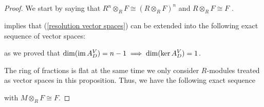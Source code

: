 \begin{proof} 
  We start by saying that $R^n\otimes_R F\cong (R\otimes_R F)^n$ and $R\otimes_R F\cong F$ \cite[Proposition~2.14]{atiyah}.

    implies that (\ref{resolution vector spaces}) can be extended into the following exact sequence of vector spaces:
   \begin{center}
   \end{center}
   as we proved that $\dim(\operatorname{im} A_D^V)=n-1\implies \dim(\ker A_D^V)=1$.

  The ring of fractions is flat \cite[Chapter~3]{atiyah} at the same time we only consider $R$-modules treated as vector spaces in this proposition. Thus, we have the following exact sequence
  \begin{center}
  \end{center}
  with $M\otimes_R F\cong F$.
\end{proof}
